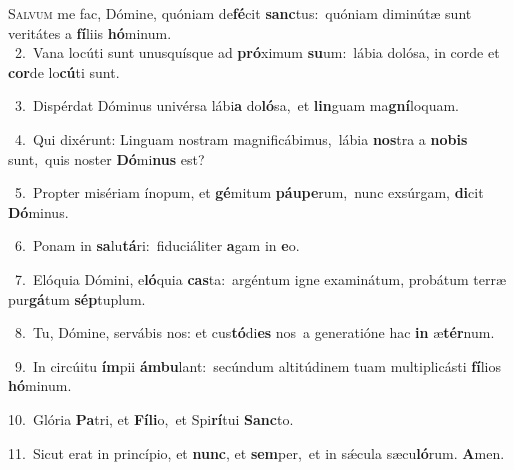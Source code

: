 \lettrine{\initial\textcolor{\initialcolor}{S}}{alvum} me fac, Dómine, quóniam de\-\textbf{fé}\-cit \textbf{sanc}\-tus:~\star quóniam diminútæ sunt veritátes a \textbf{fí}\-liis \textbf{hó}\-minum.\\
{\numbfont\textcolor{\numbcolor}{~2.}}~Vana locúti sunt unusquísque ad \textbf{pró}\-ximum \textbf{su}\-um:~\star lábia dolósa, in corde et \textbf{cor}\-de lo\-\textbf{cú}\-ti sunt.\par
{\numbfont\textcolor{\numbcolor}{~3.}}~Dispérdat Dóminus univérsa lábi\textbf{a} do\-\textbf{ló}\-sa,~\star et \textbf{lin}\-guam ma\-\textbf{gní}\-loquam.\par
{\numbfont\textcolor{\numbcolor}{~4.}}~Qui dixérunt: Linguam nostram magnificábimus,~\dagger lábia \textbf{nos}\-tra a \textbf{no}\-\textbf{bis} sunt,~\star quis noster \textbf{Dó}\-mi\textbf{nus} est?\par
{\numbfont\textcolor{\numbcolor}{~5.}}~Propter misériam ínopum, et \textbf{gé}\-mitum \textbf{páu}\-\textbf{pe}rum,~\star nunc exsúrgam, \textbf{di}\-cit \textbf{Dó}\-minus.\par
{\numbfont\textcolor{\numbcolor}{~6.}}~Ponam in \textbf{sa}\-lu\-\textbf{tá}\-ri:~\star fiduciáliter \textbf{a}\-gam in \textbf{e}\-o.\par
{\numbfont\textcolor{\numbcolor}{~7.}}~Elóquia Dómini, e\-\textbf{ló}\-quia \textbf{cas}\-ta:~\star argéntum igne examinátum, probátum terræ pur\-\textbf{gá}\-tum \textbf{sép}\-tuplum.\par
{\numbfont\textcolor{\numbcolor}{~8.}}~Tu, Dómine, servábis nos: et cus\-\textbf{tó}\-di\textbf{es} nos~\star a generatióne hac \textbf{in} æ\-\textbf{tér}\-num.\par
{\numbfont\textcolor{\numbcolor}{~9.}}~In circúitu \textbf{ím}\-pii \textbf{ám}\-\textbf{bu}lant:~\star secúndum altitúdinem tuam multiplicásti \textbf{fí}\-lios \textbf{hó}\-minum.\par
{\numbfont\textcolor{\numbcolor}{10.}}~Glória \textbf{Pa}\-tri, et \textbf{Fí}\-\textbf{li}o,~\star et Spi\-\textbf{rí}\-tui \textbf{Sanc}\-to.\par
{\numbfont\textcolor{\numbcolor}{11.}}~Sicut erat in princípio, et \textbf{nunc}\-, et \textbf{sem}\-per,~\star et in sǽcula sæcu\-\textbf{ló}\-rum. \textbf{A}\-men.\par

